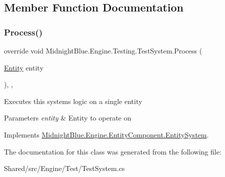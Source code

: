 \subsection{Member Function Documentation}
\hypertarget{class_midnight_blue_1_1_engine_1_1_testing_1_1_test_system_ac62a56362815c277e8c784246932fab4}{}\label{class_midnight_blue_1_1_engine_1_1_testing_1_1_test_system_ac62a56362815c277e8c784246932fab4} 
\subsubsection{\texorpdfstring{Process()}{Process()}}
{\footnotesize\ttfamily override void Midnight\+Blue.\+Engine.\+Testing.\+Test\+System.\+Process (\begin{DoxyParamCaption}\item[{\hyperlink{class_midnight_blue_1_1_engine_1_1_entity_component_1_1_entity}{Entity}}]{entity }\end{DoxyParamCaption})\hspace{0.3cm}{\ttfamily [inline]}, {\ttfamily [protected]}, {\ttfamily [virtual]}}



Executes this systems logic on a single entity 


\begin{DoxyParams}{Parameters}
{\em entity} & Entity to operate on\\
\hline
\end{DoxyParams}


Implements \hyperlink{class_midnight_blue_1_1_engine_1_1_entity_component_1_1_entity_system_a94aa715ac6bfe9a720c3d12d56c7598c}{Midnight\+Blue.\+Engine.\+Entity\+Component.\+Entity\+System}.



The documentation for this class was generated from the following file\+:\begin{DoxyCompactItemize}
\item 
Shared/src/\+Engine/\+Test/Test\+System.\+cs\end{DoxyCompactItemize}
